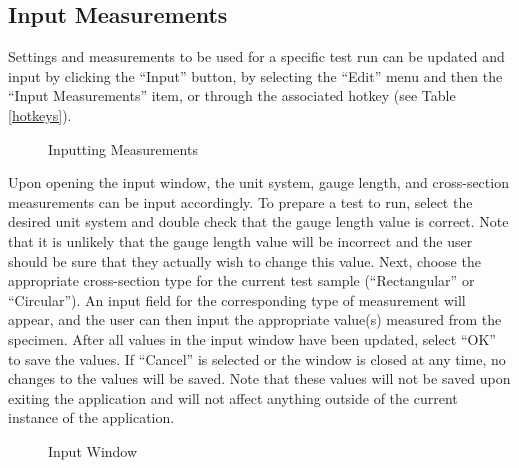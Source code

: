 \documentclass[12pt,letterpaper, USenglish]{article}
\theoremstyle{definition}
\numberwithin{theorem}{section}
\numberwithin{lemma}{section}
\numberwithin{corollary}{section}
\numberwithin{definition}{section}
\numberwithin{example}{section}
\numberwithin{equation}{theorem}
\begin{document}
\subsection{Input Measurements} \label{inputSection}
Settings and measurements to be used for a specific test run can be updated and input by clicking the ``Input'' button, by selecting the ``Edit'' menu and then the ``Input Measurements'' item, or through the associated hotkey (see Table \ref{hotkeys}). 
\begin{figure}[H]
    \centering
    \hspace{1em}
    \caption{Inputting Measurements}
\end{figure}
Upon opening the input window, the unit system, gauge length, and cross-section measurements can be input accordingly. To prepare a test to run, select the desired unit system and double check that the gauge length value is correct. Note that it is unlikely that the gauge length value will be incorrect and the user should be sure that they actually wish to change this value. Next, choose the appropriate cross-section type for the current test sample (``Rectangular'' or ``Circular''). An input field for the corresponding type of measurement will appear, and the user can then input the appropriate value(s) measured from the specimen. After all values in the input window have been updated, select ``OK'' to save the values. If ``Cancel'' is selected or the window is closed at any time, no changes to the values will be saved. 
Note that these values will not be saved upon exiting the application and will not affect anything outside of the current instance of the application.
\begin{figure}[H]
    \centering
    \hspace{1em}
    \caption{Input Window}
\end{figure}
\end{document}
